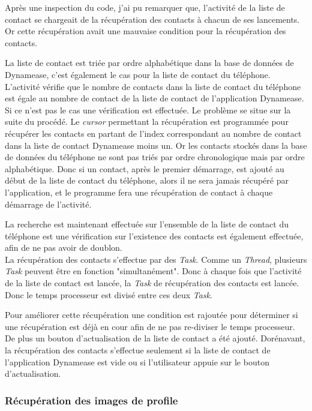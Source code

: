 Après une inspection du code, j'ai pu remarquer que, l'activité de la liste de contact se chargeait de la récupération des contacts à chacun de ses lancements. Or cette récupération avait une mauvaise condition pour la récupération des contacts.

La liste de contact est triée par ordre alphabétique dans la base de données de Dynamease, c'est également le cas pour la liste de contact du téléphone. L'activité vérifie que le nombre de contacts dans la liste de contact du téléphone est égale au nombre de contact de la liste de contact de l'application Dynamease. Si ce n'est pas le cas une vérification est effectuée. Le problème se situe sur la suite du procédé. Le \textit{cursor} permettant la récupération est programmée pour récupérer les contacts en partant de l'index correspondant au nombre de contact dans la liste de contact Dynamease moins un. Or les contacts stockés dans la base de données du téléphone ne sont pas triés par ordre chronologique mais par ordre alphabétique. Donc si un contact, après le premier démarrage, est ajouté au début de la liste de contact du téléphone, alors il ne sera jamais récupéré par l'application, et le programme fera une récupération de contact à chaque démarrage de l'activité.

La recherche est maintenant effectuée sur l'ensemble de la liste de contact du téléphone est une vérification sur l'existence des contacts est également effectuée, afin de ne pas avoir de doublon.\\ 

La récupération des contacts s'effectue par des \textit{Task}. Comme un \textit{Thread}, plusieurs \textit{Task} peuvent être en fonction "simultanément". Donc à chaque fois que l'activité de la liste de contact est lancée, la \textit{Task} de récupération des contacts est lancée. Donc le temps processeur est divisé entre ces deux \textit{Task}.

Pour améliorer cette récupération une condition est rajoutée pour déterminer si une récupération est déjà en cour afin de ne pas re-diviser le temps processeur. De plus un bouton d'actualisation de la liste de contact a été ajouté. Dorénavant, la récupération des contacts s'effectue seulement si la liste de contact de l'application Dynamease est vide ou si l'utilisateur appuie sur le bouton d'actualisation.

\subsubsection{Récupération des images de profile}

